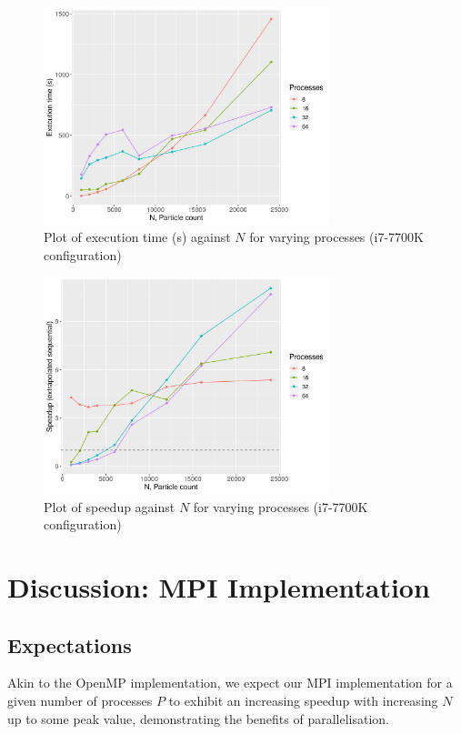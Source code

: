\documentclass[12pt]{article}
\begin{document}
\begin{figure}[H]
    \centering
    \includegraphics[width=0.74\textwidth]{processedCpuResults/PureI7-varyNandProcesses.png}
    \caption{Plot of execution time (s) against $N$ for varying processes (i7-7700K configuration)}
    \label{fig:PureI7-varyNandProcesses}
\end{figure}

\begin{figure}[H]
    \centering
    \includegraphics[width=0.74\textwidth]{processedCpuResults/PureI7-seqSpeedup.png}
    \caption{Plot of speedup against $N$ for varying processes (i7-7700K configuration)}
    \label{fig:PureI7-seqSpeedup}
\end{figure}

\pagebreak

\section{Discussion: MPI Implementation}
\label{section:mpi-discussion}

\subsection{Expectations}
Akin to the OpenMP implementation, we expect our MPI implementation for a given number of processes $P$ to exhibit an increasing speedup with increasing $N$ up to some peak value, demonstrating the benefits of parallelisation.\\
\end{document}
